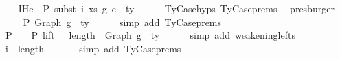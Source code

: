 \begin{isabellebody}
\isanewline
\ \ \isamarkupfalse%
\ IHe{}{\isacharcolon}{\kern0pt}\ {\isachardoublequoteopen}{\isasymGamma}{}\ {\isasymturnstile}{\isacharbraceleft}{\kern0pt}P{\isacharbraceright}{\kern0pt}\ subst\ i\ xs\ g{}\ e{}\ {\isacharcolon}{\kern0pt}\ ty{}{\isacharprime}{\kern0pt}{\isachardoublequoteclose}\isanewline
\ \ \ \ \isamarkupfalse%
\ TyCase{\isachardot}{\kern0pt}hyps{\isacharparenleft}{\kern0pt}{}{\isacharparenright}{\kern0pt}\ TyCase{\isachardot}{\kern0pt}prems{\isacharparenleft}{\kern0pt}{}{\isacharcomma}{\kern0pt}{}{\isacharcomma}{\kern0pt}{}{\isacharcomma}{\kern0pt}{}{\isacharcomma}{\kern0pt}{}{\isacharparenright}{\kern0pt}\ \isamarkupfalse%
\ presburger\isanewline
\isanewline
\ \ \isamarkupfalse%
\ {\isachardoublequoteopen}{\isasymGamma}{}\ {\isasymturnstile}{\isacharbraceleft}{\kern0pt}P{\isacharbraceright}{\kern0pt}\ Graph\ g{}\ {\isacharcolon}{\kern0pt}\ ty{}{\isachardoublequoteclose}\isanewline
\ \ \ \ \isamarkupfalse%
\ {\isacharparenleft}{\kern0pt}simp\ add{\isacharcolon}{\kern0pt}\ TyCase{\isachardot}{\kern0pt}prems{\isacharparenleft}{\kern0pt}{}{\isacharparenright}{\kern0pt}{\isacharparenright}{\kern0pt}\isanewline
\ \ \isamarkupfalse%
\ \isamarkupfalse%
\ P{}{\isacharcolon}{\kern0pt}\ {\isachardoublequoteopen}{\isasymGamma}{}{\isacharprime}{\kern0pt}\ {\isacharat}{\kern0pt}\ {\isasymGamma}{}\ {\isasymturnstile}{\isacharbraceleft}{\kern0pt}P{\isacharbraceright}{\kern0pt}\ {\isacharparenleft}{\kern0pt}lift\ {}\ {\isacharcircum}{\kern0pt}{\isacharcircum}{\kern0pt}\ length\ {\isasymGamma}{}{\isacharprime}{\kern0pt}{\isacharparenright}{\kern0pt}\ {\isacharparenleft}{\kern0pt}Graph\ g{}{\isacharparenright}{\kern0pt}\ {\isacharcolon}{\kern0pt}\ ty{}{\isachardoublequoteclose}\isanewline
\ \ \ \ \isamarkupfalse%
\ {\isacharparenleft}{\kern0pt}simp\ add{\isacharcolon}{\kern0pt}\ weakening{\isacharunderscore}{\kern0pt}lefts{\isacharparenright}{\kern0pt}\isanewline
\isanewline
\ \ \isamarkupfalse%
\ {\isachardoublequoteopen}i\ {\isasymle}\ length\ {\isasymGamma}{}{\isachardoublequoteclose}\isanewline
\ \ \ \ \isamarkupfalse%
\ {\isacharparenleft}{\kern0pt}simp\ add{\isacharcolon}{\kern0pt}\ TyCase{\isachardot}{\kern0pt}prems{\isacharparenleft}{\kern0pt}{}{\isacharparenright}{\kern0pt}{\isacharparenright}{\kern0pt}\isanewline

\end{isabellebody}
